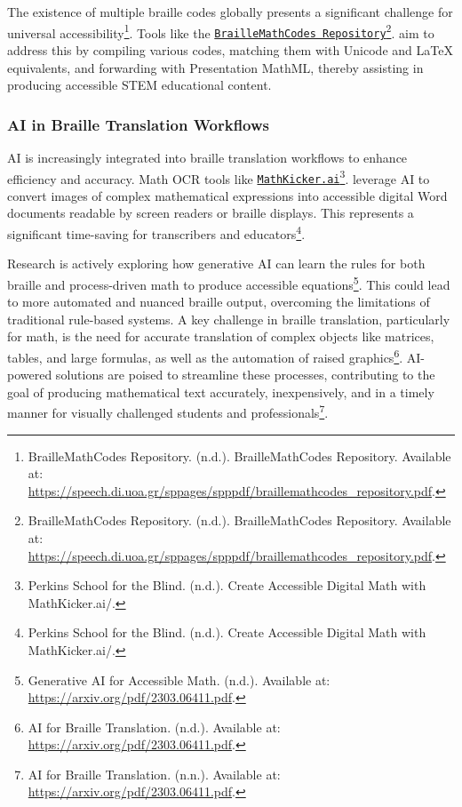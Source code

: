 The existence of multiple braille codes globally presents a significant challenge for universal accessibility\footnote{BrailleMathCodes Repository. (n.d.). BrailleMathCodes Repository. Available at: \url{https://speech.di.uoa.gr/sppages/spppdf/braillemathcodes_repository.pdf}.}. Tools like the \href{https://speech.di.uoa.gr/sppages/spppdf/braillemathcodes_repository.pdf}{\texttt{BrailleMathCodes Repository}}\footnote{BrailleMathCodes Repository. (n.d.). BrailleMathCodes Repository. Available at: \url{https://speech.di.uoa.gr/sppages/spppdf/braillemathcodes_repository.pdf}.}. aim to address this by compiling various codes, matching them with Unicode and LaTeX equivalents, and forwarding with Presentation MathML, thereby assisting in producing accessible STEM educational content.

\subsubsection{AI in Braille Translation Workflows}
AI is increasingly integrated into braille translation workflows to enhance efficiency and accuracy. Math OCR tools like \href{https://www.perkins.org/resource/create-accessible-digital-math-with-mathkicker-ai/}{\texttt{MathKicker.ai}}\footnote{Perkins School for the Blind. (n.d.). Create Accessible Digital Math with MathKicker.ai/.}. leverage AI to convert images of complex mathematical expressions into accessible digital Word documents readable by screen readers or braille displays. This represents a significant time-saving for transcribers and educators\footnote{Perkins School for the Blind. (n.d.). Create Accessible Digital Math with MathKicker.ai/.}.

Research is actively exploring how generative AI can learn the rules for both braille and process-driven math to produce accessible equations\footnote{Generative AI for Accessible Math. (n.d.). Available at: \url{https://arxiv.org/pdf/2303.06411.pdf}.}. This could lead to more automated and nuanced braille output, overcoming the limitations of traditional rule-based systems. A key challenge in braille translation, particularly for math, is the need for accurate translation of complex objects like matrices, tables, and large formulas, as well as the automation of raised graphics\footnote{AI for Braille Translation. (n.d.). Available at: \url{https://arxiv.org/pdf/2303.06411.pdf}.}. AI-powered solutions are poised to streamline these processes, contributing to the goal of producing mathematical text accurately, inexpensively, and in a timely manner for visually challenged students and professionals\footnote{AI for Braille Translation. (n.n.). Available at: \url{https://arxiv.org/pdf/2303.06411.pdf}.}.

